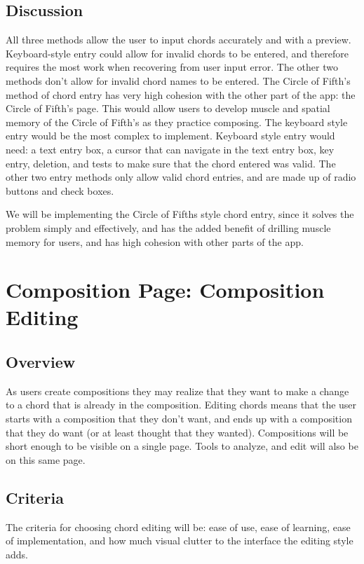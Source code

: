 \documentclass[onecolumn, draftclsnofoot,10pt, compsoc]{IEEEtran}
\begin{document}
\subsection{Discussion}
All three methods allow the user to input chords accurately and with a preview.
Keyboard-style entry could allow for invalid chords to be entered, and therefore requires the most work when recovering from user input error.
The other two methods don't allow for invalid chord names to be entered.
The Circle of Fifth's method of chord entry has very high cohesion with the other part of the app: the Circle of Fifth's page.
This would allow users to develop muscle and spatial memory of the Circle of Fifth's as they practice composing.
The keyboard style entry would be the most complex to implement.
Keyboard style entry would need:
a text entry box,
a cursor that can navigate in the text entry box,
key entry,
deletion,
and tests to make sure that the chord entered was valid.
The other two entry methods only allow valid chord entries, and are made up of radio buttons and check boxes.

We will be implementing the Circle of Fifths style chord entry, 
since it solves the problem simply and effectively,
and has the added benefit of drilling muscle memory for users,
and has high cohesion with other parts of the app.

\section{Composition Page: Composition Editing}
\subsection{Overview}
As users create compositions they may realize that they want to make a change to a chord that is already in the composition.
Editing chords means that the user starts with a composition that they don't want, and ends up with a composition that they do want (or at least thought that they wanted).
Compositions will be short enough to be visible on a single page.
Tools to analyze, and edit will also be on this same page.

\subsection{Criteria}
The criteria for choosing chord editing will be:
ease of use,
ease of learning,
ease of implementation,
and how much visual clutter to the interface the editing style adds.
\end{document}
